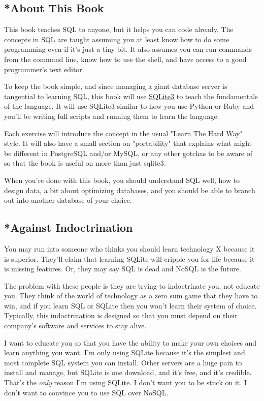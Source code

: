 \subsection{*About This Book}

This book teaches SQL to anyone, but it helps you can code already.  The 
concepts in SQL are taught assuming you at least know how to do some programming
even if it's just a tiny bit.  It also assumes you can run commands from the
command line, know how to use the shell, and have access to a good programmer's
text editor.

To keep the book simple, and since managing a giant database server is tangential
to learning SQL, this book will use \href{http://sqlite.org}{SQLite3} to teach
the fundamentals of the language.  It will use SQLite3 similar to how you use
Python or Ruby and you'll be writing full  scripts and running them
to learn the language.  

Each exercise will introduce the concept in the usual "Learn The Hard Way" style.
It will also have a small section on "portability" that explains what might be
different in PostgreSQL and/or MySQL, or any other gotchas to be aware of so that
the book is useful on more than just sqlite3.

When you're done with this book, you should understand SQL well, how to design
data, a bit about optimizing databases, and you should be able to branch out into
another database of your choice.


\subsection{*Against Indoctrination}

You may run into someone who thinks you should learn technology X because 
it is superior.  They'll claim that learning SQLite will cripple you for
life because it is missing features.  Or, they may say SQL is dead and
NoSQL is the future.

The problem with these people is they are trying to indoctrinate you, not
educate you.  They think of the world of technology as a zero sum game
that they have to win, and if you learn SQL or SQLite then you won't
learn their system of choice.  Typically, this indoctrination is designed
so that you must depend on their company's software and services to 
stay alive.

I want to educate you so that you have the ability to make your own choices and
learn anything you want.  I'm only using SQLite because it's the simplest and
most complete SQL system you can install.  Other servers are a huge pain to
install and manage, but SQLite is one download, and it's free, and it's
credible. That's the \emph{only} reason I'm using SQLite.  I don't want you to
be stuck on it.  I don't want to convince you to use SQL over NoSQL.

